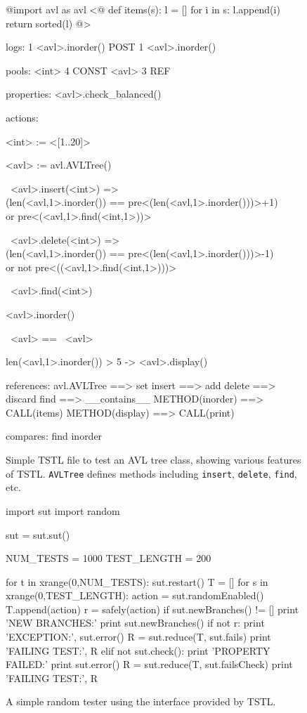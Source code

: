 \begin{figure}
\begin{code}
@import avl as avl
<@
def items(s):
    l = []
    for i in s:
       l.append(i)
    return sorted(l)
@>

logs:
	1 <avl>.inorder()
	POST 1 <avl>.inorder()

pools:
	<int> 4 CONST
	<avl> 3 REF

properties:
	<avl>.check\_balanced()

actions:

<int> := <[1..20]>

<avl> := avl.AVLTree()


~<avl>.insert(<int>) => \\
   (len(<avl,1>.inorder()) == pre<(len(<avl,1>.inorder()))>+1) \\
   or pre<(<avl,1>.find(<int,1>))>

~<avl>.delete(<int>) => \\
   (len(<avl,1>.inorder()) == pre<(len(<avl,1>.inorder()))>-1) \\
   or not pre<((<avl,1>.find(<int,1>)))>

~<avl>.find(<int>)

<avl>.inorder()

~<avl> == ~<avl>

len(<avl,1>.inorder()) > 5 -> <avl>.display()

references:
	avl.AVLTree ==> set
	insert ==> add
	delete ==> discard
	find ==> \_\_contains\_\_
  	METHOD(inorder) ==> CALL(items)
	METHOD(display) ==> CALL(print)

compares:
	find
	inorder
\end{code}
\caption{Simple TSTL file to test an AVL tree class,
  showing various features of TSTL.  {\tt AVLTree} defines methods
  including {\tt insert}, {\tt delete}, {\tt find}, etc.}
\label{fig:avl}
\end{figure}

\begin{figure}
\begin{code}
import sut
import random

sut = sut.sut()

NUM\_TESTS = 1000
TEST\_LENGTH = 200 

for t in xrange(0,NUM\_TESTS):
   sut.restart()
   T = []
   for s in xrange(0,TEST\_LENGTH): 
       action = sut.randomEnabled()
       T.append(action)
       r = safely(action)
       if sut.newBranches() != []
          print 'NEW BRANCHES:'
          print sut.newBranches()
       if not r:
          print 'EXCEPTION:', sut.error() 
          R = sut.reduce(T, sut.fails) 
          print 'FAILING TEST:', R
       elif not sut.check():
          print 'PROPERTY FAILED:'
          print sut.error()  
          R = sut.reduce(T, sut.failsCheck) 
          print 'FAILING TEST:', R
\end{code}
\caption{A simple random tester using the interface provided by TSTL.}
\label{fig:rt}
\end{figure}

